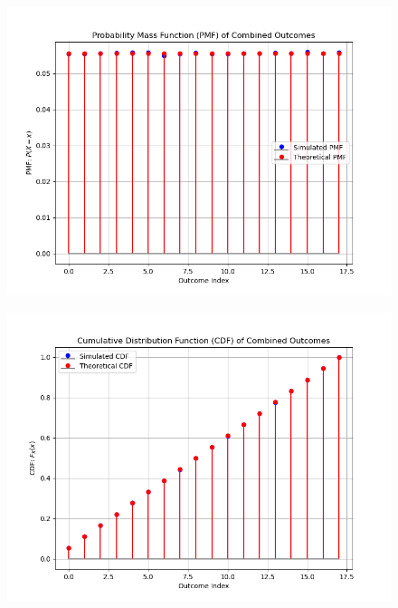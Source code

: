 \documentclass[journal,12pt,onecolumn]{IEEEtran}
\theoremstyle{remark}
\begin{document}
\begin{figure}[h]
	\centering
	\includegraphics[width=\columnwidth]{figs/pmf_combined_stem.png}
\end{figure}


\begin{figure}[h]
	\centering
	\includegraphics[width=\columnwidth]{figs/cdf_combined_stem.png}
\end{figure}
\end{document}
